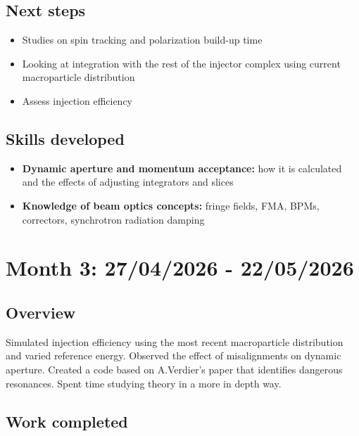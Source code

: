 \documentclass{article}
\begin{document}
\subsection{Next steps}
\begin{itemize}
    \item Studies on spin tracking and polarization build-up time
    \item Looking at integration with the rest of the injector complex using current macroparticle distribution
    \item Assess injection efficiency
\end{itemize}

\subsection{Skills developed}
\begin{itemize}
    \item \textbf{Dynamic aperture and momentum acceptance:} how it is calculated and the effects of adjusting integrators and slices
    \item \textbf{Knowledge of beam optics concepts:} fringe fields, FMA, BPMs, correctors, synchrotron radiation damping
\end{itemize}


\section{Month 3: 27/04/2026 - 22/05/2026}
\subsection{Overview}
Simulated injection efficiency using the most recent macroparticle distribution and varied reference energy. Observed the effect of misalignments on dynamic aperture. Created a code based on A.Verdier's paper that identifies dangerous resonances. Spent time studying theory in a more in depth way.
\subsection{Work completed}
\end{document}
